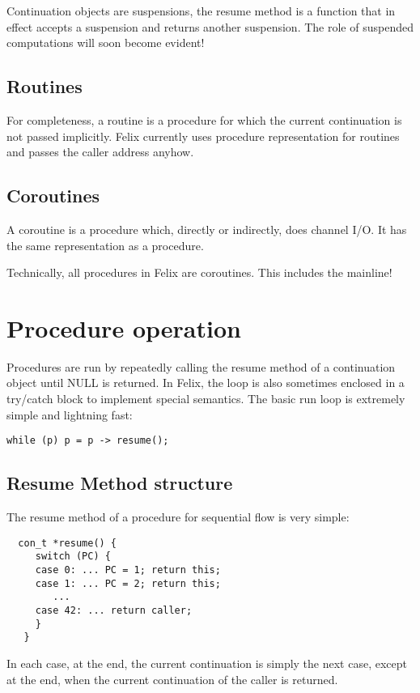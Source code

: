 \documentclass[oneside]{book}
\begin{document}
Continuation objects are suspensions, the resume method is a function that
in effect accepts a suspension and returns another suspension. The role
of suspended computations will soon become evident!

\subsection{Routines}
For completeness, a routine is a procedure for which the current continuation
is not passed implicitly.  Felix currently uses procedure representation for
routines and passes the caller address anyhow.

\subsection{Coroutines}
A coroutine is a procedure which, directly or indirectly, does channel I/O.
It has the same representation as a procedure.

Technically, all procedures in Felix are coroutines. This includes the mainline!

\section{Procedure operation}
Procedures are run by repeatedly calling the resume method of a continuation
object until NULL is returned. In Felix, the loop is also sometimes enclosed
in a try/catch block to implement special semantics. The basic run loop is
extremely simple and lightning fast:

\begin{verbatim}
while (p) p = p -> resume();
\end{verbatim}

\subsection{Resume Method structure}
The resume method of a procedure for sequential flow is very simple:
\begin{verbatim}
  con_t *resume() {
     switch (PC) {
     case 0: ... PC = 1; return this;
     case 1: ... PC = 2; return this;
        ...
     case 42: ... return caller;
     }
   }
\end{verbatim}

In each case, at the end, the current continuation is simply the next case,
except at the end, when the current continuation of the caller is returned.
\end{document}

